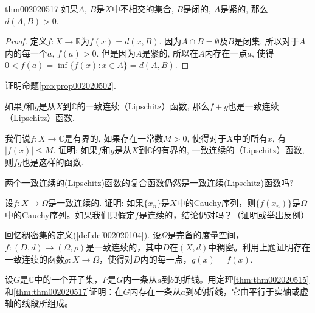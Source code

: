 \begin{theorem}{}{thm002020517}
如果$A$, $B$是$X$中不相交的集合, $B$是闭的, $A$是紧的, 那么$d(A, B) > 0$. 
\end{theorem}

\begin{proof}
定义$f: X \to \mathbb{R}$为$f(x) = d(x, B)$. 因为$A \cap B = \emptyset$及$B$是闭集, 所以对于$A$内的每一个$a$, $f(a) > 0$. 但是因为$A$是紧的, 所以在$A$内存在一点$a$, 使得$0 < f(a) = \inf\{f(x): x \in A\} = d(A, B)$. 
\end{proof}

\begin{exercise}
证明命题\ref{pro:prop002020502}. 
\end{exercise}

\begin{exercise}
如果$f$和$g$是从$X$到$\mathbb{C}$的一致连续（Lipschitz）函数, 那么$f+g$也是一致连续（Lipschitz）函数. 
\end{exercise}

\begin{exercise}\label{exer002020503}
我们说$f:X \to \mathbb{C}$是有界的, 如果存在一常数$M > 0$, 使得对于$X$中的所有$x$, 有$|f(x)| \le M$. 证明: 如果$f$和$g$是从$X$到$\mathbb{C}$的有界的, 一致连续的（Lipschitz）函数, 则$fg$也是这样的函数.
\end{exercise}

\begin{exercise}
两个一致连续的(Lipschitz)函数的复合函数仍然是一致连续(Lipschitz)函数吗?
\end{exercise}

\begin{exercise}
设$f:X \to \Omega$是一致连续的. 证明: 如果$\{x_n\}$是$X$中的Cauchy序列，则$\{f(x_n)\}$是$\Omega$中的Cauchy序列。如果我们只假定$f$是连续的，结论仍对吗？（证明或举出反例）
\end{exercise}

\begin{exercise}\label{exer002020506}
回忆稠密集的定义(\ref{def:def002020104}). 设$\Omega$是完备的度量空间，$f: (D, d) \to (\Omega,\rho)$是一致连续的，其中$D$在$(X, d)$中稠密。利用上题证明存在一致连续的函数$g:X \to \Omega$，使得对$D$内的每一点，$g(x)=f(x)$.
\end{exercise}

\begin{exercise}\label{exer002020507}
设$G$是$\mathbb{C}$中的一个开子集，$P$是$G$内一条从$a$到$b$的折线。用定理\ref{thm:thm002020515}和\ref{thm:thm002020517}证明：在$G$内存在一条从$a$到$b$的折线，它由平行于实轴或虚轴的线段所组成。
\end{exercise}

